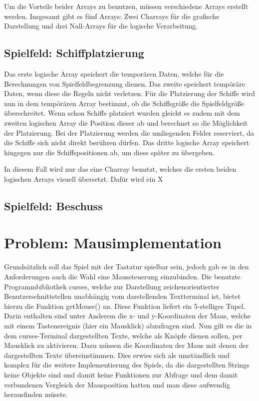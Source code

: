 \documentclass{llncs}
\begin{document}
Um die Vorteile beider Arrays zu benutzen, müssen verschiedene Arrays erstellt werden. Insgesamt gibt es fünf Arrays: Zwei Charrays für die grafische Darstellung und drei Null-Arrays für die logische Verarbeitung.

\subsection{Spielfeld: Schiffplatzierung}

Das erste logische Array speichert die temporären Daten, welche für die Berechnungen von Spielfeldbegrenzung dienen. Das zweite speichert tempöräre Daten, wenn diese die Regeln nicht verletzen.
Für die Platzierung der Schiffe wird nun in dem tempörären Array bestimmt, ob die Schiffsgröße die Spielfeldgröße überschreitet. Wenn schon Schiffe platziert wurden gleicht es zudem mit dem zweiten logischen
Array die Position dieser ab und berechnet so die Möglichkeit der Platzierung. Bei der Platzierung werden die umliegenden Felder reserviert, da die Schiffe sich nicht direkt berühren dürfen. Das dritte logische 
Array speichert hingegen nur die Schiffspositionen ab, um diese später zu übergeben.

In diesem Fall wird nur das eine Charray benutzt, welches die ersten beiden logischen Arrays visuell übersetzt. Dafür wird ein \glqq X\grqq{}

\subsection{Spielfeld: Beschuss}

\section{Problem: Mausimplementation}

Grundsätzlich soll das Spiel mit der Tastatur spielbar sein, jedoch gab es in den Anforderungen auch die Wahl eine Maussteuerung einzubinden.
Die benutzte Programmbibliothek \glqq curses\grqq{}, welche zur Darstellung zeichenorientierter Benutzerschnittstellen unabhängig vom darstellenden Textterminal ist,
bietet hierzu die Funktion \glqq getMouse()\grqq{} an. Diese Funktion liefert ein 5-stelliges Tupel. Darin enthalten sind unter Anderem die x- und y-Koordinaten der Maus,
welche mit einem Tastenereignis (hier ein Mausklick) abzufragen sind. Nun gilt es die in dem curses-Terminal dargestellten Texte, welche als Knöpfe dienen sollen,
per Mausklick zu aktivieren. Dazu müssen die Koordinaten der Maus mit denen der dargestellten Texte übereinstimmen. Dies erwies sich als umständlich und komplex für die
weitere Implementierung des Spiels, da die dargestellten Strings keine Objekte sind und damit keine Funktionen zur Abfrage und dem damit verbundenen Vergleich der Mausposition hatten und man diese aufwendig herausfinden müsste.
\end{document}
